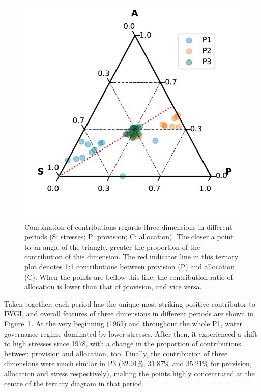 \documentclass[9pt, twocolumn, twoside, lineno]{pnas-new}
\begin{document}
\begin{figure}[!htbp]
	\centering
	\includegraphics[width=0.9\linewidth]{../../figures/main/phases.pdf}
	\caption{Combination of contributions regards three dimensions in different periods (S: stresses; P: provision; C: allocation). The closer a point to an angle of the triangle, greater the proportion of the contribution of this dimension.
	The red indicator line in this ternary plot denotes 1:1 contributions between provision (P) and allocation (C). When the points are bellow this line, the contribution ratio of allocation is lower than that of provision, and vice versa.}
	\label{fig:phases}
\end{figure}

Taken together, each period has the unique most striking positive contributor to IWGI, and overall features of three dimensions in different periods are shown in Figure~\ref{fig:phases}.
At the very beginning (1965) and throughout the whole P1, water governance regime dominated by lower stresses. After then, it experienced a shift to high stresses since 1978, with a change in the proportion of contributions between provision and allocation, too.
Finally, the contribution of three dimensions were much similar in P3 (32.91\%, 31.87\% and 35.21\% for provision, allocation and stress respectively), making the points highly concentrated at the centre of the ternary diagram in that period.
\end{document}

